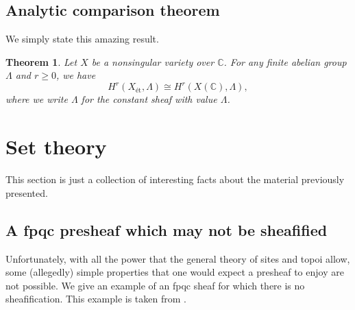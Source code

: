 \documentclass{amsart}
\newtheorem{theorem}{Theorem}[section]
\theoremstyle{definition}
\theoremstyle{remark}
\begin{document}
\subsection{Analytic comparison theorem}

We simply state this amazing result.

\begin{theorem}
    Let $X$ be a nonsingular variety over $\mathbb{C}$. For any finite abelian
    group $\Lambda$ and $r \geq 0$, we have
    \[
        H^{r}(X_{\text{\'et}}, \Lambda) \cong H^r(X(\mathbb{C}), \Lambda),
    \]
    where we write $\Lambda$ for the constant sheaf with value $\Lambda$.
\end{theorem}

\section{Set theory}

This section is just a collection of interesting facts about the material
previously presented.

\subsection{A fpqc presheaf which may not be sheafified}

Unfortunately, with all the power that the general theory of sites and topoi
allow, some (allegedly) simple properties that one would expect a presheaf to
enjoy are not possible. We give an example of an fpqc sheaf for which there is
no sheafification. This example is taken from \cite{fpqc-sheaf}.
\end{document}

